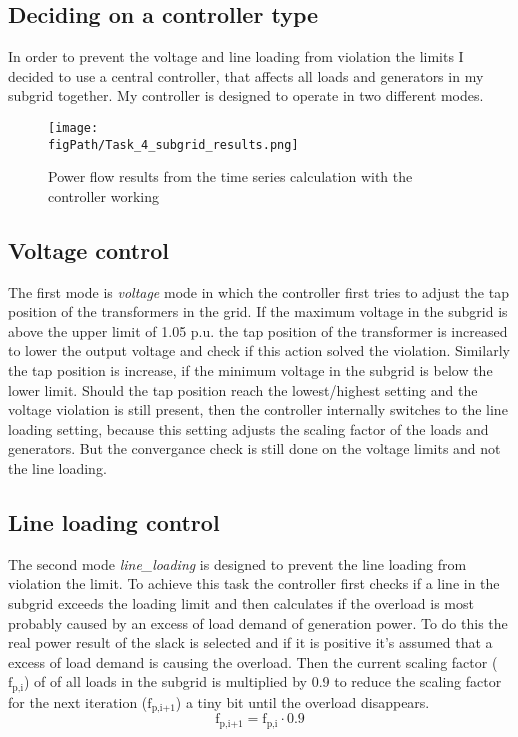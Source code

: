 \documentclass[conference]{IEEEtran}
\newcommand{\figPath}{images}
\begin{document}
\subsection{Deciding on a controller type}
In order to prevent the voltage and line loading from violation the limits I decided to use a central controller, that affects all loads and generators in my subgrid together. My controller is designed to operate in two different modes. 
\begin{figure*}[htbp]
	\centering
	\texttt{[image: \\figPath/Task\_4\_subgrid\_results.png]}
	\caption{Power flow results from the time series calculation with the controller working}
	\label{fig:pf_res_task_4}
\end{figure*}
\subsection*{Voltage control}
The first mode is \textit{voltage} mode in which the controller first tries to adjust the tap position of the transformers in the grid. If the maximum voltage in the subgrid is above the upper limit of 1.05 p.u. the tap position of the transformer is increased to lower the output voltage and check if this action solved the violation. Similarly the tap position is increase, if the minimum voltage in the subgrid is below the lower limit. Should the tap position reach the lowest/highest setting and the voltage violation is still present, then the controller internally switches to the line loading setting, because this setting adjusts the scaling factor of the loads and generators. But the convergance check is still done on the voltage limits and not the line loading.
\subsection*{Line loading control}
The second mode \textit{line\_loading} is designed to prevent the line loading from violation the limit. To achieve this task the controller first checks if a line in the subgrid exceeds the loading limit and then calculates if the overload is most probably caused by an excess of load demand of generation power. To do this the real power result of the slack is selected and if it is positive it's assumed that a excess of load demand is causing the overload. Then the current scaling factor ($\text{f}_{\text{p,i}}$) of of all loads in the subgrid is multiplied by 0.9 to reduce the scaling factor for the next iteration ($\text{f}_{\text{p,i+1}}$) a tiny bit until the overload disappears.
\begin{equation}
	\text{f}_{\text{p,i+1}} = \text{f}_{\text{p,i}} \cdot 0.9
\end{equation}
\end{document}

